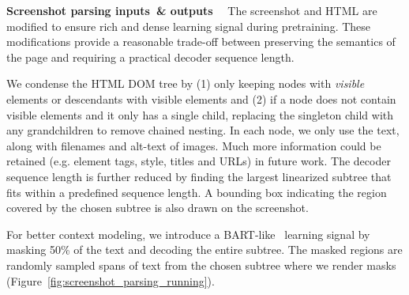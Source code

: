 \documentclass{article} %
\begin{document}
\textbf{Screenshot parsing inputs~\& outputs}~~
The screenshot and HTML are modified to ensure rich and dense learning signal during pretraining. These modifications provide a reasonable trade-off between preserving the semantics of the page and requiring a practical decoder sequence length.

We condense the HTML DOM tree by (1) only keeping nodes with \emph{visible} elements or descendants with visible elements and (2) if a node does not contain visible elements and it only has a single child, replacing the singleton child with any grandchildren to remove chained nesting. In each node, we only use the text, along with filenames and alt-text of images. Much more information could be retained (e.g. element tags, style, titles and URLs) in future work. The decoder sequence length is further reduced by finding the largest linearized subtree that fits within a predefined sequence length. A bounding box indicating the region covered by the chosen subtree is also drawn on the screenshot.

For better context modeling, we introduce a BART-like~\citep{lewis-etal-2020-bart} learning signal by masking 50\% of the text and decoding the entire subtree. The masked regions are randomly sampled spans of text from the chosen subtree where we render masks (Figure~\ref{fig:screenshot_parsing_running}).
\end{document}
